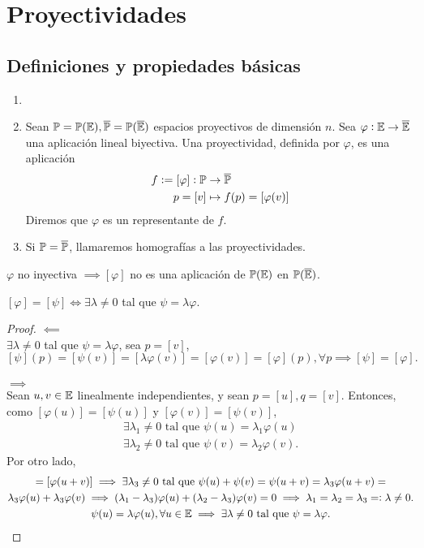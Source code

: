 \chapter{Proyectividades}
\section{Definiciones y propiedades básicas}

\begin{defi}
	\begin{enumerate}
		\item[]
		\item Sean $\mathbb{P} = \mathbb{P}(\mathbb{E}), \overline{\mathbb{P}} = \mathbb{P}(\overline{\mathbb{E}})$ espacios proyectivos de dimensión $n$. Sea $\varphi : \mathbb{E} \to \overline{\mathbb{E}}$ una aplicación lineal biyectiva. Una proyectividad, definida por $\varphi$, es una aplicación
		\begin{align*}
			f := [\varphi] : \mathbb{P} &\to \overline{\mathbb{P}} \\
			p = [v] &\mapsto f(p) = [\varphi(v)]
		\end{align*}
		Diremos que $\varphi$ es un representante de $f$.
		\item Si $\mathbb{P} = \overline{\mathbb{P}}$, llamaremos homografías a las proyectividades.
	\end{enumerate}
\end{defi}
\begin{obs}
	$\varphi$ no inyectiva $\implies [\varphi]$ no es una aplicación de $\mathbb{P}(\mathbb{E})$ en $\mathbb{P}(\overline{\mathbb{E}})$.
\end{obs}
\begin{obs}
	$[\varphi] = [\psi] \iff \exists \lambda \neq 0$ tal que $\psi = \lambda \varphi$.
\end{obs}
\begin{proof}
	$\impliedby$ \\
	$\exists \lambda \neq 0$ tal que $\psi = \lambda\varphi$, sea $p = [v]$, $[\psi](p) = [\psi(v)] = [\lambda\varphi(v)] = [\varphi(v)] = [\varphi](p), \forall p \implies [\psi] = [\varphi].$ \\ \\
	$\implies$ \\
	Sean $u, v \in \mathbb{E}$ linealmente independientes, y sean $p = [u], q = [v]$. Entonces, como $[\varphi(u)] = [\psi(u)]$ y $[\varphi(v)] = [\psi(v)]$,
	\begin{gather*}
		\exists \lambda_1 \neq 0 \text{ tal que } \psi(u) = \lambda_1 \varphi(u) \\
		\exists \lambda_2 \neq 0 \text{ tal que } \psi(v) = \lambda_2 \varphi(v).
	\end{gather*}
	Por otro lado,
	\begin{gather*}
		[\psi(u+v)] = [\varphi(u+v)] \implies \exists \lambda_3 \neq 0 \text{ tal que } \psi(u) + \psi(v) = \psi(u+v) = \lambda_3 \varphi(u+v) = \\ \lambda_3 \varphi(u) + \lambda_3 \varphi(v) \implies (\lambda_1 - \lambda_3) \varphi(u) + (\lambda_2-\lambda_3) \varphi(v) = 0 \implies \lambda_1 = \lambda_2 = \lambda_3 =: \lambda \neq 0. \\
		\psi(u) = \lambda \varphi(u), \forall u \in \E \implies \exists \lambda \neq 0 \text{ tal que } \psi = \lambda \varphi.
	\end{gather*}
\end{proof}
